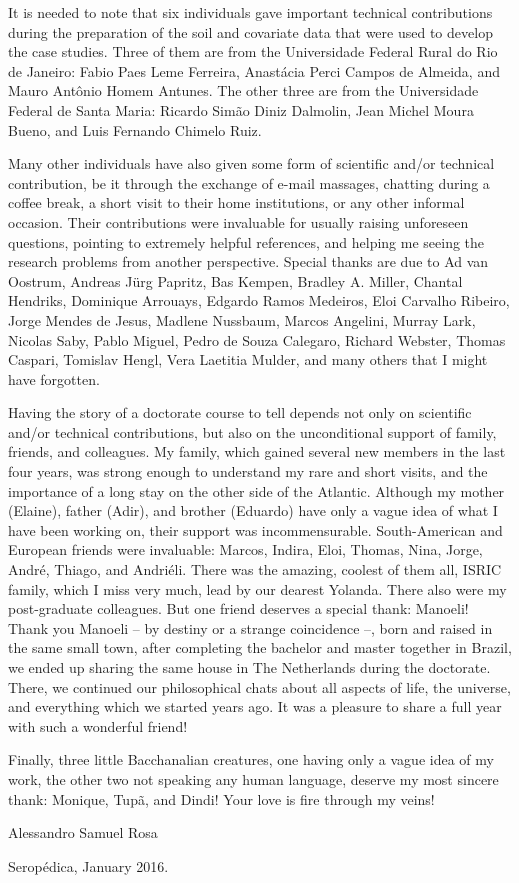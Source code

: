 It is needed to note that six individuals gave important technical contributions during the preparation of 
the soil and covariate data that were used to develop the case studies. Three of them are from the Universidade 
Federal Rural do Rio de Janeiro: Fabio Paes Leme Ferreira, Anastácia Perci Campos de Almeida, and Mauro Antônio 
Homem Antunes. The other three are from the Universidade Federal de Santa Maria: Ricardo Simão Diniz Dalmolin, 
Jean Michel Moura Bueno, and Luis Fernando Chimelo Ruiz.

Many other individuals have also given some form of scientific and/or technical contribution, be it through 
the exchange of e-mail massages, chatting during a coffee break, a short visit to their home institutions, or 
any other informal occasion. Their contributions were invaluable for usually raising unforeseen questions, 
pointing to extremely helpful references, and helping me seeing the research problems from another perspective.
Special thanks are due to Ad van Oostrum, Andreas Jürg Papritz, Bas Kempen, Bradley A. Miller, Chantal 
Hendriks, Dominique Arrouays, Edgardo Ramos Medeiros, Eloi Carvalho Ribeiro, Jorge Mendes de Jesus, Madlene 
Nussbaum, Marcos Angelini, Murray Lark, Nicolas Saby, Pablo Miguel, Pedro de Souza Calegaro, Richard Webster, 
Thomas Caspari, Tomislav Hengl, Vera Laetitia Mulder, and many others that I might have forgotten.

Having the story of a doctorate course to tell depends not only on scientific and/or technical contributions,
but also on the unconditional support of family, friends, and colleagues. My family, which gained several new 
members in the last four years, was strong enough to understand my rare and short visits, and the importance of 
a long stay on the other side of the Atlantic. Although my mother (Elaine), father (Adir), and brother 
(Eduardo) have only a vague idea of what I have been working on, their support was incommensurable. 
South-American and European friends were invaluable: Marcos, Indira, Eloi, Thomas, Nina, Jorge, André, Thiago, 
and Andriéli. There was the amazing, coolest of them all, ISRIC family, which I miss very much, lead by 
our dearest Yolanda. There also were my post-graduate colleagues. But one friend deserves a special thank: 
Manoeli! Thank you Manoeli -- by destiny or a strange coincidence --, born and raised in the same small town, 
after completing the bachelor and master together in Brazil, we ended up sharing the same house in The 
Netherlands during the doctorate. There, we continued our philosophical chats about all aspects of life, the 
universe, and everything which we started years ago. It was a pleasure to share a full year with such a 
wonderful friend!

Finally, three little Bacchanalian creatures, one having only a vague idea of my work, the other two not 
speaking any human language, deserve my most sincere thank: Monique, Tupã, and Dindi! Your love is fire through 
my veins!

\begin{flushright}
 Alessandro Samuel Rosa
 
 Seropédica, January 2016.
\end{flushright}
